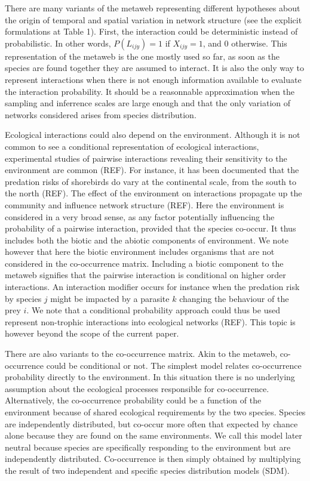 \documentclass[12pt]{article}
\begin{document}
There are many variants of the metaweb representing different hypotheses about
the origin of temporal and spatial variation in network structure (see the
explicit formulations at Table 1). First, the interaction could be 
deterministic instead of probabilistic. In other words, $P(L_{ijy}) = 1$ if
$X_{ijy} = 1$, and 0 otherwise. This representation of the metaweb is the one
mostly used so far, as soon as the species are found together they are assumed
to interact. It is also the only way to represent interactions when there is not
enough information available to evaluate the interaction probability. It should be a
reasonnable approximation when the sampling and inferrence scales are large
enough and that the only variation of networks considered arises from species
distribution. 

Ecological interactions could also depend on the environment.
Although it is not common to see a conditional representation of ecological
interactions, experimental studies of pairwise interactions revealing their
sensitivity to the environment are common (REF). For instance, it has been
documented that the predation risks of shorebirds do vary at the continental
scale, from the south to the north (REF). The effect of the environment on
interactions propagate up the community and influence network structure (REF).
Here the environment is considered in a very broad sense, as any factor
potentially influencing the probability of a pairwise interaction, provided that
the species co-occur. It thus includes both the biotic and the abiotic
components of environment. We note however that here the biotic environment
includes organisms that are not considered in the co-occurrence matrix.
Including a biotic component to the metaweb signifies that the pairwise
interaction is conditional on higher order interactions. An interaction modifier
occurs for instance when the predation risk by species $j$ might be impacted by
a parasite $k$ changing the behaviour of the prey $i$. We note that a
conditional probability approach could thus be used represent non-trophic
interactions into ecological networks (REF). This topic is however beyond the
scope of the current paper.

There are also variants to the co-occurrence matrix. Akin to the metaweb,
co-occurrence could be conditional or not. The simplest model relates
co-occurrence probability directly to the environment. In this situation there
is no underlying assumption about the ecological processes responsible for
co-occurrence. Alternatively, the co-occurrence probability could be a function
of the environment because of shared ecological requirements by the two species.
Species are independently distributed, but co-occur more often that expected by
chance alone because they are found on the same environments. We call this model
later neutral because species are specifically responding to the environment but
are independently distributed. Co-occurrence is then simply obtained by
multiplying the result of two independent and specific species distribution
models (SDM).
\end{document}
